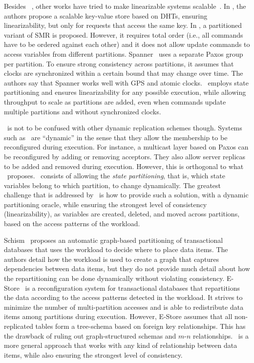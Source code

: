 Besides \ssmr{}~\cite{bezerra2014ssmr}, other works have tried to make linearizable systems scalable~\cite{corbett2013spanner, Glendenning2011, Marandi11}.
In \cite{Glendenning2011}, the authors propose a scalable key-value store based on DHTs, ensuring linearizability, but only for requests that access the same key. 
In \cite{Marandi11}, a partitioned variant of SMR is proposed.
However, it requires total order (i.e., all commands have to be ordered against each other) and it does not allow update commands to access variables from different partitions.
Spanner~\cite{corbett2013spanner} uses a separate Paxos group per partition.
To ensure strong consistency across partitions, it assumes that clocks are synchronized within a certain bound that may change over time.
The authors say that Spanner works well with GPS and atomic clocks.
\dssmrlong\ employs state partitioning and ensures linearizability for any possible execution, while allowing throughput to scale as partitions are added, even when commands update multiple partitions and without synchronized clocks.


\dssmr\ is not to be confused with other dynamic replication schemes though. Systems such as~\cite{birman2010dsr,guessoum2003dar,dustdar2007soc} are ``dynamic'' in the sense that they allow the membership to be reconfigured during execution. For instance, a multicast layer based on Paxos can be reconfigured by adding or removing acceptors. They also allow server replicas to be added and removed during execution.
However, this is orthogonal to what \dssmr\ proposes.
\dssmrlong\ consists of allowing the \emph{state partitioning}, that is, which state variables belong to which partition, to change dynamically.
The greatest challenge that is addressed by \dssmr\ is how to provide such a solution, with a dynamic partitioning oracle, while ensuring the strongest level of consistency (linearizability), as variables are created, deleted, and moved across partitions, based on the access patterns of the workload.


Schism~\cite{curino2010sch} proposes an automatic graph-based partitioning of transactional databases that uses the workload to decide where to place data items.
The authors detail how the workload is used to create a graph that captures dependencies between data items, but they do not provide much detail about how the repartitioning can be done dynamically without violating consistency.
E-Store~\cite{taft2014est} is a reconfiguration system for transactional databases that repartitions the data according to the access patterns detected in the workload.
It strives to minimize the number of multi-partition accesses and is able to redistribute data items among partitions during execution.
However, E-Store assumes that all non-replicated tables form a tree-schema based on foreign key relationships.
This has the drawback of ruling out graph-structured schemas and \mbox{$m$-$n$} relationships.
\dssmr\ is a more general approach that works with any kind of relationship between data items, while also ensuring the strongest level of consistency.

